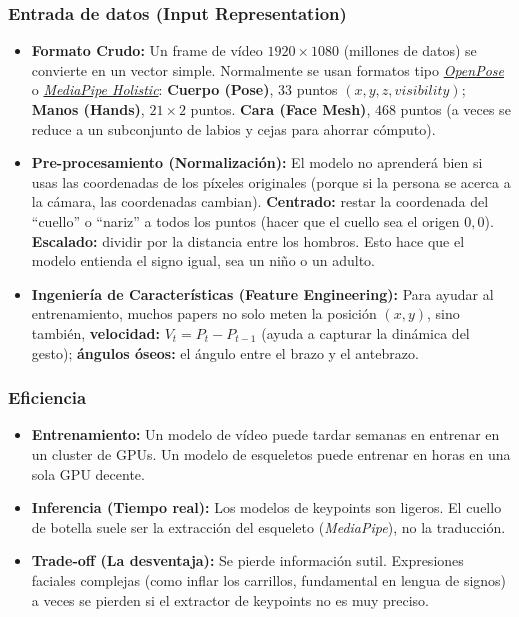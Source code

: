 \documentclass[11pt,a4paper]{article}
\begin{document}
\subsubsection*{Entrada de datos (Input Representation)}
\begin{itemize}
	\item \textbf{Formato Crudo:} Un frame de vídeo $1920 \times 1080$ (millones de datos) se convierte en un vector simple. Normalmente se usan formatos tipo \emph{\href{https://github.com/CMU-Perceptual-Computing-Lab/openpose}{OpenPose}} o \emph{\href{https://github.com/google-ai-edge/mediapipe/blob/master/docs/solutions/holistic.md}{MediaPipe Holistic}}: \textbf{Cuerpo (Pose)}, 33 puntos $(x, y, z, visibility)$; \textbf{Manos (Hands)}, $21 \times 2$ puntos. \textbf{Cara (Face Mesh)}, $468$ puntos (a veces se reduce a un subconjunto de labios y cejas para ahorrar cómputo).
	\item \textbf{Pre-procesamiento (Normalización):} El modelo no aprenderá bien si usas las coordenadas de los píxeles originales (porque si la persona se acerca a la cámara, las coordenadas cambian). \textbf{Centrado:} restar la coordenada del ``cuello'' o ``nariz'' a todos los puntos (hacer que el cuello sea el origen $0,0$). \textbf{Escalado:} dividir por la distancia entre los hombros. Esto hace que el modelo entienda el signo igual, sea un niño o un adulto.
	\item \textbf{Ingeniería de Características (Feature Engineering):} Para ayudar al entrenamiento, muchos papers no solo meten la posición $(x,y)$, sino también, \textbf{velocidad:} $V_t = P_t - P_{t-1}$ (ayuda a capturar la dinámica del gesto); \textbf{ángulos óseos:} el ángulo entre el brazo y el antebrazo.
\end{itemize}
\subsubsection*{Eficiencia}
\begin{itemize}
	\item \textbf{Entrenamiento:} Un modelo de vídeo puede tardar semanas en entrenar en un cluster de GPUs. Un modelo de esqueletos puede entrenar en horas en una sola GPU decente.
	\item \textbf{Inferencia (Tiempo real):} Los modelos de keypoints son ligeros. El cuello de botella suele ser la extracción del esqueleto (\emph{MediaPipe}), no la traducción.
	\item \textbf{Trade-off (La desventaja):} Se pierde información sutil. Expresiones faciales complejas (como inflar los carrillos, fundamental en lengua de signos) a veces se pierden si el extractor de keypoints no es muy preciso.
\end{itemize}
\end{document}
